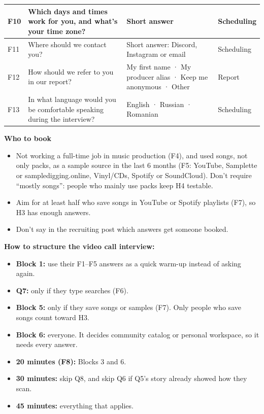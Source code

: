 \documentclass[12pt,a4paper]{report}
\begin{document}
\begin{xltabular}{\textwidth}{|>{\raggedright\arraybackslash}p{0.9cm}|>{\hsize\raggedright\arraybackslash}X|>{\hsize\raggedright\arraybackslash}X|>{\raggedright\arraybackslash}p{2.1cm}|}
\hline
F10 & Which days and times work for you, and what’s your time zone? & Short answer & Scheduling \\
\hline
F11 & Where should we contact you? & Short answer: Discord, Instagram or email & Scheduling \\
\hline
F12 & How should we refer to you in our report? & My first name · My producer alias · Keep me anonymous · Other & Report \\
\hline
F13 & In what language would you be comfortable speaking during the interview? & English · Russian · Romanian & Scheduling \\
\hline
\end{xltabular}
\endgroup

\textbf{Who to book}
\begin{itemize}[leftmargin=*, itemsep=2pt]
\item Not working a full-time job in music production (F4), and used songs, not only packs, as a sample source in the last 6 months (F5: YouTube, Samplette or sampledigging.online, Vinyl/CDs, Spotify or SoundCloud). Don’t require “mostly songs”: people who mainly use packs keep H4 testable.
\item Aim for at least half who save songs in YouTube or Spotify playlists (F7), so H3 has enough answers.
\item Don’t say in the recruiting post which answers get someone booked.
\end{itemize}

\textbf{How to structure the video call interview:}
\begin{itemize}[leftmargin=*, itemsep=2pt]
\item \textbf{Block 1:} use their F1–F5 answers as a quick warm-up instead of asking again.
\item \textbf{Q7:} only if they type searches (F6).
\item \textbf{Block 5:} only if they save songs or samples (F7). Only people who save songs count toward H3.
\item \textbf{Block 6:} everyone. It decides community catalog or personal workspace, so it needs every answer.
\item \textbf{20 minutes (F8):} Blocks 3 and 6.
\item \textbf{30 minutes:} skip Q8, and skip Q6 if Q5’s story already showed how they scan.
\item \textbf{45 minutes:} everything that applies.
\end{itemize}
\end{document}

